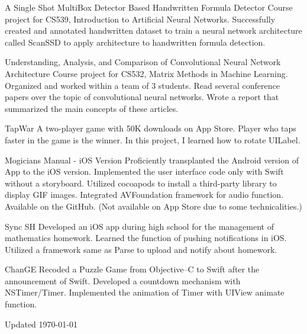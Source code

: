 \documentclass[11pt,letterpaper]{report}
\begin{document}
    \begin{tablist}

    \item[A Single Shot MultiBox Detector Based Handwritten Formula Detector] \tab{}
        Course project for CS539, Introduction to Artificial Neural Networks. Successfully created and annotated handwritten dataset to train a neural network architecture called ScanSSD to apply architecture to handwritten formula detection.
    \item[Understanding, Analysis, and Comparison of Convolutional Neural Network Architecture] \tab{}
        Course project for CS532, Matrix Methods in Machine Learning. Organized and worked within a team of 3 students. Read several conference papers over the topic of convolutional neural networks. Wrote a report that summarized the main concepts of these articles.
    \item[TapWar] \tab{} \newline
        A two-player game with 50K downloads on App Store. Player who taps faster in the game is the winner. In this project, I learned how to rotate UILabel.
    \item[Mogicians Manual - iOS Version] \tab{}
      Proficiently transplanted the Android version of App to the iOS version. Implemented the user interface code only with Swift without a storyboard. Utilized cocoapods to install a third-party library to display GIF images. Integrated AVFoundation framework for audio function. Available on the GitHub. (Not available on App Store due to some technicalities.)
    \item[Sync SH] \tab{} \newline
      Developed an iOS app during high school for the management of mathematics homework. Learned the function of pushing notifications in iOS. Utilized a framework same as Parse to upload and notify about homework.
    \item[ChanGE] \tab{} \newline
      Recoded a Puzzle Game from Objective–C to Swift after the announcement of Swift. Developed a countdown mechanism with NSTimer/Timer. Implemented the animation of Timer with UIView animate function.
    \end{tablist}


    \begin{center}
        \vfill
        Updated \monthyeardate\today
    \end{center}
\end{document}
